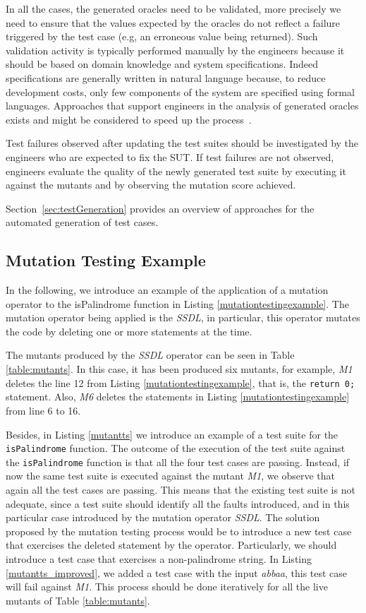 In all the cases, the generated oracles need to be validated, more precisely we need to ensure that the values expected by the oracles do not reflect a failure triggered by the test case (e.g, an erroneous value being returned). Such validation activity is typically performed manually by the engineers because it should be based on domain knowledge and system specifications. Indeed specifications are generally written in natural language because, to reduce development costs, only few components of the system are specified using formal languages.
Approaches that support engineers in the analysis of generated oracles exists and might be considered to speed up the process~\cite{PastoreICSE2015}.

Test failures observed after updating the test suites should be investigated by the engineers who are expected to fix the SUT.
If test failures are not observed, engineers evaluate the quality of the newly generated test suite by executing it against the mutants and by observing the mutation score achieved. 

Section~\ref{sec:testGeneration} provides an overview of approaches for the automated generation of test cases.

\subsection{Mutation Testing Example} 

In the following, we introduce an example of the application of a mutation operator to the isPalindrome function in Listing \ref{mutationtestingexample}. The mutation operator being applied is the \textit{SSDL}, in particular, this operator mutates the code by deleting one or more statements at the time.



The mutants produced by the \textit{SSDL} operator can be seen in Table \ref{table:mutants}. In this case, it has been produced six mutants, for example, \textit{M1} deletes the line 12 from Listing \ref{mutationtestingexample}, that is, the \texttt{return 0;} statement. Also, \textit{M6} deletes the statements in Listing \ref{mutationtestingexample} from line 6 to 16.

Besides, in Listing \ref{mutantts} we introduce an example of a test suite for the \texttt{isPalindrome} function. The outcome of the execution of the test suite against the \texttt{isPalindrome} function is that all the four test cases are passing.
Instead, if now the same test suite is executed against the mutant \textit{M1}, we observe that again all the test cases are passing. This means that the existing test suite is not adequate, since a test suite should identify all the faults introduced, and in this particular case introduced by the mutation operator \textit{SSDL}.
The solution proposed by the mutation testing process would be to introduce a new test case that exercises the deleted statement by the operator. Particularly, we should introduce a test case that exercises a non-palindrome string. In Listing \ref{mutantts_improved}, we added a test case with the input \textit{abbaa}, this test case will fail against \textit{M1}. This process should be done iteratively for all the live mutants of Table \ref{table:mutants}. 
